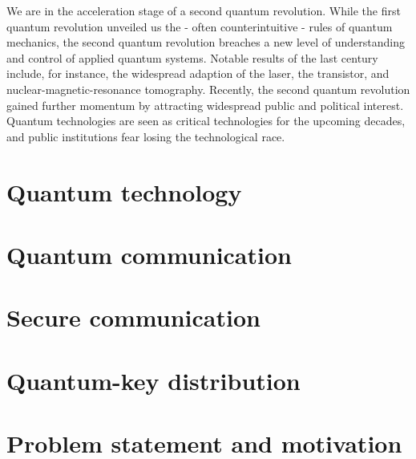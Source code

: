 We are in the acceleration stage of a second quantum revolution.
While the first quantum revolution unveiled us the - often counterintuitive - rules of quantum mechanics, the second quantum revolution breaches a new level of understanding and control of applied quantum systems.
Notable results of the last century include, for instance, the widespread adaption of the laser, the transistor, and nuclear-magnetic-resonance tomography.
Recently, the second quantum revolution gained further momentum by attracting widespread public and political interest.
Quantum technologies are seen as critical technologies for the upcoming decades, and public institutions fear losing the technological race.


\section{Quantum technology}

\section{Quantum communication}

\section{Secure communication}


\section{Quantum-key distribution}


\section{Problem statement and motivation}

